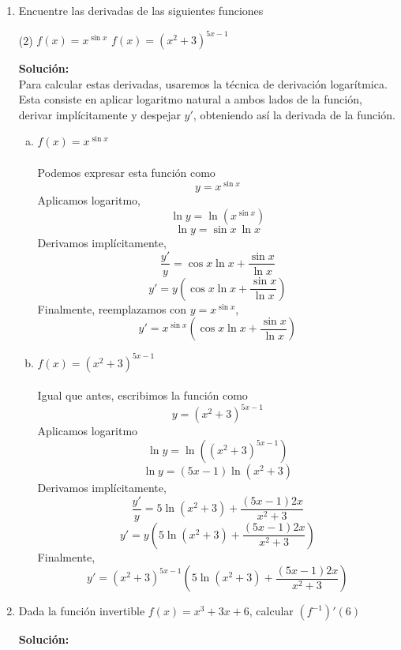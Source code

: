 \documentclass[12pt]{article}
\newenvironment{solucion}
{\begin{mdframed}[backgroundcolor=black!10]
		{\bf Solución:}\\
	}
	{
	\end{mdframed}
}
\newenvironment{preguntas}
{\begin{enumerate}\itemsep12pt
	}
	{
	\end{enumerate}
}
\begin{document}
\begin{preguntas}
\begin{solucion}
Entonces, tomamos
$$xy' + 2yy' = 2x-y$$
Y derivamos implícitamente,
$$y' + xy'' + 2y'^2+2yy'' = 2 - y'$$
Luego, despejamos $y''$,
$$xy''+2yy'' = 2 - y' - y' - 2y'^2$$
$$y''(x+2y) = 2 - 2y' - 2y'^2$$
$$y'' = \dfrac{2 - 2y' - 2y'^2}{x+2y}$$
Ahora, notemos que
$$y'(1,1) = \dfrac{2-1}{1+2} = \dfrac{1}{3}$$
Luego,
$$y''(1,1) = \dfrac{2-2\dfrac{1}{3} - 2\left(\dfrac{1}{3}\right)^2}{1+2} 
= \dfrac{2-\dfrac{2}{3}-\dfrac{2}{9}}{3}
= \dfrac{2-\dfrac{2}{3}-\dfrac{2}{9}}{3}
= \dfrac{10}{27}
$$
\end{solucion}
\item Encuentre las derivadas de las siguientes funciones
\begin{tasks}(2)
\task $f(x) = x^{\sin x}$
\task $f(x) = (x^2+3)^{5x-1}$
\end{tasks}
\begin{solucion}
Para calcular estas derivadas, usaremos la técnica de derivación logarítmica. Esta consiste en aplicar logaritmo natural a ambos lados de la función, derivar implícitamente y despejar $y'$, obteniendo así la derivada de la función.
\begin{enumerate}[a)]
\item $f(x) = x^{\sin x}$\\
\\
Podemos expresar esta función como
$$y = x^{\sin x}$$
Aplicamos logaritmo,
$$\ln y = \ln(x^{\sin x})$$
$$\ln y = \sin x\ \ln x$$
Derivamos implícitamente,
$$\dfrac{y'}{y} = \cos x \ln x + \dfrac{\sin x}{\ln x}$$
$$y' = y(\cos x \ln x + \dfrac{\sin x}{\ln x})$$
Finalmente, reemplazamos con $y = x^{\sin x}$,
$$y' = x^{\sin x}(\cos x \ln x + \dfrac{\sin x}{\ln x})$$
\item $f(x) = (x^2+3)^{5x-1}$\\
\\
Igual que antes, escribimos la función como
$$y = (x^2+3)^{5x-1}$$
Aplicamos logaritmo
$$\ln y = \ln((x^2+3)^{5x-1})$$
$$\ln y = (5x-1)\ln(x^2+3)$$
Derivamos implícitamente,
$$\dfrac{y'}{y} = 5\ln(x^2+3) + \dfrac{(5x-1)2x}{x^2+3}$$
$$y' = y(5\ln(x^2+3) + \dfrac{(5x-1)2x}{x^2+3})$$
Finalmente,
$$y' = (x^2+3)^{5x-1}(5\ln(x^2+3) + \dfrac{(5x-1)2x}{x^2+3})$$
\end{enumerate}
\end{solucion}
\item Dada la función invertible $f(x) = x^3 + 3x + 6$, calcular $(f^{-1})'(6)$
\begin{solucion}


\end{solucion}
\end{preguntas}
\end{document}
